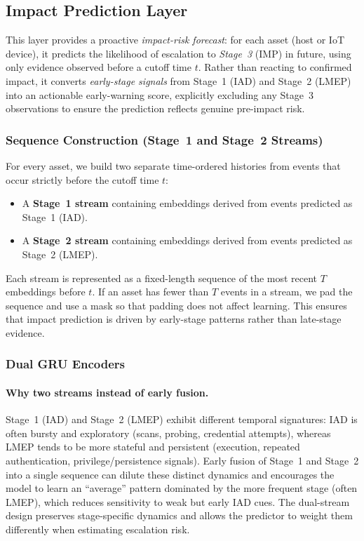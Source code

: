 \documentclass[pdflatex,sn-mathphys-num]{sn-jnl}
\theoremstyle{thmstyleone}%
\theoremstyle{thmstyletwo}%
\theoremstyle{thmstylethree}%
\begin{document}
\subsection{Impact Prediction Layer}
\label{sec:framework_impact}
This layer provides a proactive \emph{impact-risk forecast}: for each asset (host or IoT device), it predicts the likelihood of escalation to \emph{Stage~3} (IMP) in future, using only evidence observed before a cutoff time $t$. Rather than reacting to confirmed impact, it converts \emph{early-stage signals} from Stage~1 (IAD) and Stage~2 (LMEP) into an actionable early-warning score, explicitly excluding any Stage~3 observations to ensure the prediction reflects genuine pre-impact risk.



\subsubsection{Sequence Construction (Stage~1 and Stage~2 Streams)}
\label{sec:framework_sequences}
For every asset, we build two separate time-ordered histories from events that occur strictly before the cutoff time $t$:

\begin{itemize}
    \item A \textbf{Stage~1 stream} containing embeddings derived from events predicted as Stage~1 (IAD).
    \item A \textbf{Stage~2 stream} containing embeddings derived from events predicted as Stage~2 (LMEP).
\end{itemize}

Each stream is represented as a fixed-length sequence of the most recent $T$ embeddings before $t$. If an asset has fewer than $T$ events in a stream, we pad the sequence and use a mask so that padding does not affect learning. This ensures that impact prediction is driven by early-stage patterns rather than late-stage evidence.


\subsubsection{Dual GRU Encoders}
\label{sec:framework_dualgru}

\paragraph{Why two streams instead of early fusion.}
Stage~1 (IAD) and Stage~2 (LMEP) exhibit different temporal signatures: IAD is often bursty and exploratory (scans, probing, credential attempts), whereas LMEP tends to be more stateful and persistent (execution, repeated authentication, privilege/persistence signals). Early fusion of Stage~1 and Stage~2 into a single sequence can dilute these distinct dynamics and encourages the model to learn an ``average'' pattern dominated by the more frequent stage (often LMEP), which reduces sensitivity to weak but early IAD cues. The dual-stream design preserves stage-specific dynamics and allows the predictor to weight them differently when estimating escalation risk.
\end{document}
